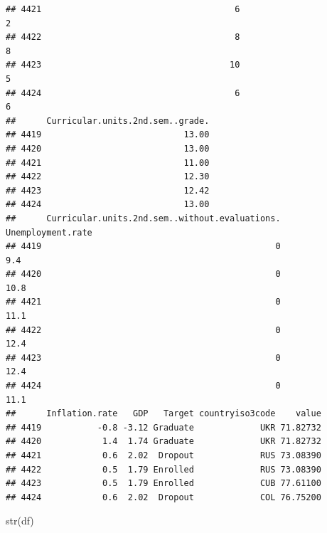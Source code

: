 \documentclass[
]{article}
\newenvironment{Shaded}{\begin{snugshade}}{\end{snugshade}}
\newcommand{\FunctionTok}[1]{\textcolor[rgb]{0.00,0.00,0.00}{#1}}
\newcommand{\NormalTok}[1]{#1}
\begin{document}
\begin{verbatim}
## 4421                                      6                                   2
## 4422                                      8                                   8
## 4423                                     10                                   5
## 4424                                      6                                   6
##      Curricular.units.2nd.sem..grade.
## 4419                            13.00
## 4420                            13.00
## 4421                            11.00
## 4422                            12.30
## 4423                            12.42
## 4424                            13.00
##      Curricular.units.2nd.sem..without.evaluations. Unemployment.rate
## 4419                                              0               9.4
## 4420                                              0              10.8
## 4421                                              0              11.1
## 4422                                              0              12.4
## 4423                                              0              12.4
## 4424                                              0              11.1
##      Inflation.rate   GDP   Target countryiso3code    value
## 4419           -0.8 -3.12 Graduate             UKR 71.82732
## 4420            1.4  1.74 Graduate             UKR 71.82732
## 4421            0.6  2.02  Dropout             RUS 73.08390
## 4422            0.5  1.79 Enrolled             RUS 73.08390
## 4423            0.5  1.79 Enrolled             CUB 77.61100
## 4424            0.6  2.02  Dropout             COL 76.75200
\end{verbatim}

\begin{Shaded}
\begin{Highlighting}[]
\FunctionTok{str}\NormalTok{(df)}
\end{Highlighting}
\end{Shaded}
\end{document}
